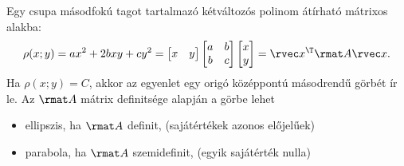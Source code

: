 \documentclass[a4paper, 12pt]{scrartcl}
\begin{document}
\begin{blueBox}

  Egy csupa másodfokú tagot tartalmazó kétváltozós polinom átírható mátrixos
  alakba:
  $$
    \rho(x;y) = a x^2 + 2b x y + c y^2 = \begin{bmatrix}
      x & y
    \end{bmatrix} \begin{bmatrix}
      a & b \\
      b & c
    \end{bmatrix} \begin{bmatrix}
      x \\
      y
    \end{bmatrix} = \rvec x^\T \rmat A \rvec x
    \text.
  $$
  Ha $\rho(x; y) = C$, akkor az egyenlet egy origó középpontú másodrendű görbét
  ír le. Az $\rmat A$ mátrix definitsége alapján a görbe lehet
  \begin{itemize}
    \item ellipszis, ha $\rmat A$ definit,
          \hfill (sajátértékek azonos előjelűek)

    \item parabola, ha $\rmat A$ szemidefinit,
          \hfill (egyik sajátérték nulla)


\end{itemize}
\end{blueBox}
\end{document}
